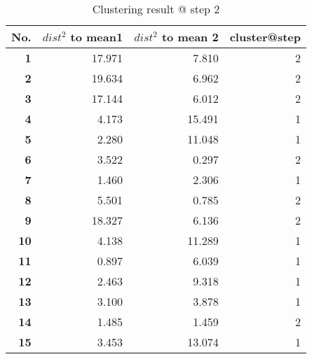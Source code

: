 \begin{table}[htbp]
  \centering
  \caption{Clustering result @ step 2}
    \begin{tabular}{rrrr}
    \toprule
    \textbf{No.} & \textbf{$dist^2$ to mean1} & \textbf{$dist^2$ to mean 2} & \textbf{cluster@step} \\
    \midrule
    \textbf{1} & 17.971  & 7.810  & 2 \\
    \textbf{2} & 19.634  & 6.962  & 2 \\
    \textbf{3} & 17.144  & 6.012  & 2 \\
    \textbf{4} & 4.173  & 15.491  & 1 \\
    \textbf{5} & 2.280  & 11.048  & 1 \\
    \textbf{6} & 3.522  & 0.297  & 2 \\
    \textbf{7} & 1.460  & 2.306  & 1 \\
    \textbf{8} & 5.501  & 0.785  & 2 \\
    \textbf{9} & 18.327  & 6.136  & 2 \\
    \textbf{10} & 4.138  & 11.289  & 1 \\
    \textbf{11} & 0.897  & 6.039  & 1 \\
    \textbf{12} & 2.463  & 9.318  & 1 \\
    \textbf{13} & 3.100  & 3.878  & 1 \\
    \textbf{14} & 1.485  & 1.459  & 2 \\
    \textbf{15} & 3.453  & 13.074  & 1 \\
    \bottomrule
    \end{tabular}%
  \label{tab:cluster_a2}%
\end{table}%
